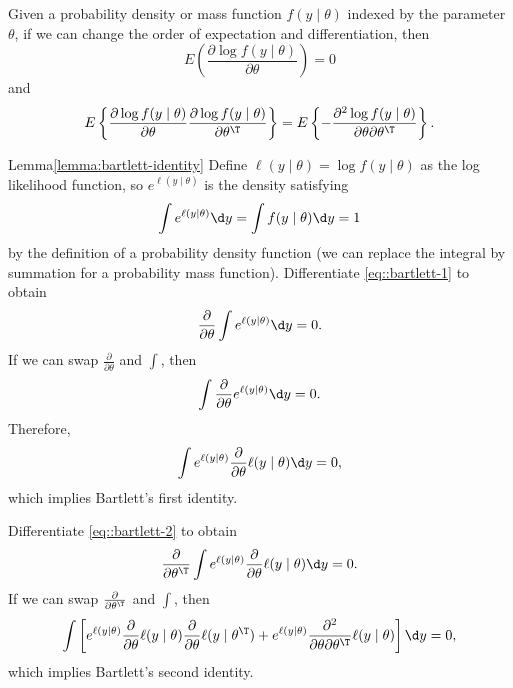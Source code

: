 \begin{lemma}
\label{lemma:bartlett-identity}
Given a probability density or mass
function $f(y\mid\theta)$ indexed by the parameter $\theta$, if we can
change the order of expectation and differentiation, then
$$
E\left(\frac{\partial\log f(y\mid\theta)}{\partial\theta}\right)=0
$$
and
$$
E\left\{  \frac{\partial \log f(y\mid \theta)}{ \partial \theta}  \frac{\partial \log f(y\mid \theta)}{ \partial \theta^{\T}}   \right\}
=
E\left\{ -  \frac{\partial^2 \log f(y\mid \theta)}{ \partial \theta  \partial \theta^{\T} }   \right\} .
$$
\end{lemma} 
 
\begin{myproof}{Lemma}{\ref{lemma:bartlett-identity}}
Define $\ell (y\mid \theta) = \log f(y\mid \theta)$ as the log likelihood function, so $e^{\ell (y\mid \theta)}$ is the density satisfying 
\begin{equation}
\label{eq::bartlett-1}
\int e^{\ell (y\mid \theta)} \d y  = \int f(y\mid \theta)\d y = 1
\end{equation}
by the definition of a probability density function (we can replace the integral by summation for a probability mass function). Differentiate \eqref{eq::bartlett-1} to obtain
$$ 
\frac{\partial }{\partial \theta} \int e^{\ell (y\mid \theta)} \d y = 0 .
$$
If we can swap $\frac{\partial }{\partial \theta}$ and $\int$, then
$$
  \int  \frac{\partial }{\partial \theta} e^{\ell (y\mid \theta)} \d y = 0 .
$$
Therefore,   
\begin{equation}
\label{eq::bartlett-2}
 \int  e^{\ell (y\mid \theta)} \frac{\partial }{\partial \theta} \ell (y\mid \theta)  \d y = 0 ,
\end{equation}
which implies Bartlett's first identity. 


Differentiate \eqref{eq::bartlett-2} to obtain
$$
\frac{\partial }{\partial \theta^{\T}}  \int  e^{\ell (y\mid \theta)} \frac{\partial }{\partial \theta} \ell (y\mid \theta)  \d y = 0 .
$$
If we can swap $\frac{\partial }{\partial \theta^{\T}}$ and $\int$, then
$$
\int  \left[ e^{\ell (y\mid \theta)}  \frac{\partial }{\partial \theta} \ell (y\mid \theta)   \frac{\partial }{\partial \theta} \ell (y\mid \theta^{\T})  
+e^{\ell (y\mid \theta)} \frac{\partial^2 }{\partial \theta \partial \theta^{\T}} \ell (y\mid \theta) \right] 
   \d y = 0 ,
$$
which implies Bartlett's second identity. 
\end{myproof}

 
 
